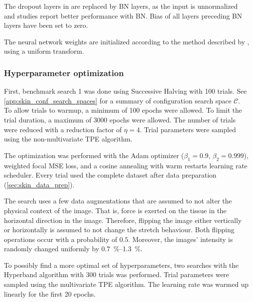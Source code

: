 The dropout layers in \cite{Soylu2022} are replaced by BN layers, as the input is unnormalized and studies report better performance with BN.
Bias of all layers preceding BN layers have been set to zero.

The neural network weights are initialized according to the method described by \textcite{He2015a}, using a uniform transform.

\subsubsection{Hyperparameter optimization}
First, benchmark search 1 was done using Successive Halving with 100 trials.
See \cref{app:skin_conf_search_spaces} for a summary of configuration search space $\mathcal{C}$.
To allow trials to warmup, a minimum of 100 epochs were allowed.
To limit the trial duration, a maximum of 3000 epochs were allowed.
The number of trials were reduced with a reduction factor of $\eta=4$.
Trial parameters were sampled using the non-multivariate TPE algorithm.

The optimization was performed with the Adam optimizer ($\beta_1=0.9$, $\beta_2=0.999$), weighted focal MSE loss, and a cosine annealing with warm restarts learning rate scheduler.
Every trial used the complete dataset after data preparation (\cref{sec:skin_data_prep}).

The search uses a few data augmentations that are assumed to not alter the physical context of the image.
That is, force is exerted on the tissue in the horizontal direction in the image.
Therefore, flipping the image either vertically or horizontally is assumed to not change the stretch behaviour.
Both flipping operations occur with a probability of $0.5$.
Moreover, the images' intensity is randomly changed uniformly by \qtyrange{0.7}{1.3}{\percent}.

To possibly find a more optimal set of hyperparameters, two searches with the Hyperband algorithm with 300 trials was performed.
Trial parameters were sampled using the multivariate TPE algorithm.
The learning rate was warmed up linearly for the first 20 epochs.


